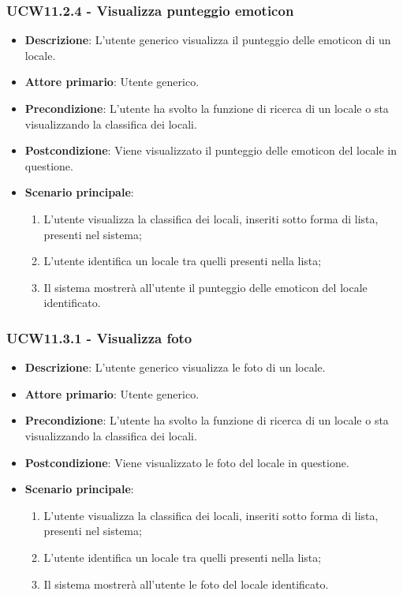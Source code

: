 \subsubsection{UCW11.2.4 - Visualizza punteggio emoticon}
\begin{itemize}
    \item \textbf{Descrizione}: L'utente generico visualizza il punteggio delle emoticon di un locale.
    \item \textbf{Attore primario}: Utente generico.
    \item \textbf{Precondizione}: L'utente ha svolto la funzione di ricerca di un locale o sta visualizzando la classifica dei locali.
    \item \textbf{Postcondizione}: Viene visualizzato il punteggio delle emoticon del locale in questione.
    \item \textbf{Scenario principale}: 
    \begin{enumerate}
        \item L'utente visualizza la classifica dei locali, inseriti sotto forma di lista, presenti nel sistema;
        \item L'utente identifica un locale tra quelli presenti nella lista;
        \item Il sistema mostrerà all'utente il punteggio delle emoticon del locale identificato.
        \end{enumerate}
\end{itemize}

\subsubsection{UCW11.3.1 - Visualizza foto}
\begin{itemize}
    \item \textbf{Descrizione}: L'utente generico visualizza le foto di un locale.
    \item \textbf{Attore primario}: Utente generico.
    \item \textbf{Precondizione}: L'utente ha svolto la funzione di ricerca di un locale o sta visualizzando la classifica dei locali.
    \item \textbf{Postcondizione}: Viene visualizzato le foto del locale in questione.
    \item \textbf{Scenario principale}: 
    \begin{enumerate}
        \item L'utente visualizza la classifica dei locali, inseriti sotto forma di lista, presenti nel sistema;
        \item L'utente identifica un locale tra quelli presenti nella lista;
        \item Il sistema mostrerà all'utente le foto del locale identificato.
        \end{enumerate}
\end{itemize}
